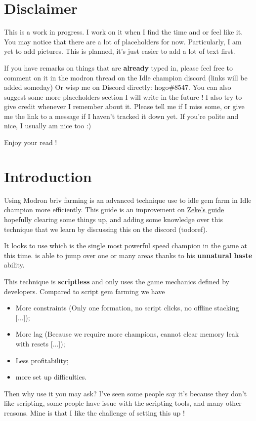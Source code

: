 \documentclass{article}
\begin{document}
\section{Disclaimer}

This is a work in progress.
I work on it when I find the time and or feel like it.
You may notice that there are a lot of placeholders for now.
Particularly, I am yet to add pictures.
This is planned, it's just easier to add a lot of text first.

If you have remarks on things that are \textbf{already} typed in, please feel free to comment on it in the modron \briv thread on the Idle champion discord (links will be added someday) Or wisp me on Discord directly: hogo\#8547.
You can also suggest some more placeholders section I will write in the future !
I also try to give credit whenever I remember about it.
Please tell me if I miss some, or give me the link to a message if I haven't tracked it down yet.
If you're polite and nice, I usually am nice too :)

Enjoy your read !

\section{Introduction}

Using Modron briv farming is an advanced technique use to idle gem farm in Idle champion more efficiently.
This guide is  an improvement on  \href{https://www.reddit.com/r/idlechampions/comments/rbldh0/automated_briv_stacking_without_scripting/}{Zeke's guide} hopefully clearing some things up, and adding some knowledge over this technique that we learn by discussing this on the discord (todoref).

It looks to use \textbf{\briv} which is the single most powerful speed champion in the game at this time.
\briv is able to jump over one or many areas thanks to his \textbf{unnatural haste} ability.

This technique is \textbf{scriptless} and only uses the game mechanics defined by developers.
Compared to script gem farming we have
\begin{itemize}
    \item More constraints (Only one formation, no script clicks, no offline stacking [...]);
    \item More lag (Because we require more champions, cannot clear memory leak with resets [...]);
    \item Less profitability;
    \item more set up difficulties. 
\end{itemize}
Then why use it you may ask?
I've seen some people say it's because they don't like scripting, some people have issue with the scripting tools, and many other reasons.
Mine is that I like the challenge of setting this up !
\end{document}
